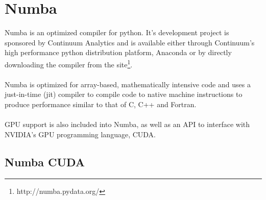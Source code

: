 \section{Numba}
Numba is an optimized compiler for python. It's development project is sponsored by Continuum Analytics and is available either through Continuum's high performance python distribution platform, Anaconda or by directly downloading the compiler from the site\footnote{http://numba.pydata.org/}.
\\
\\
Numba is optimized for array-based, mathematically intensive code and uses a just-in-time (jit) compiler to compile code to native machine instructions to produce performance similar to that of C, C++ and Fortran.
\\
\\
GPU support is also included into Numba, as well as an API to interface with NVIDIA's GPU programming language, CUDA.
%
\subsection{Numba CUDA}
